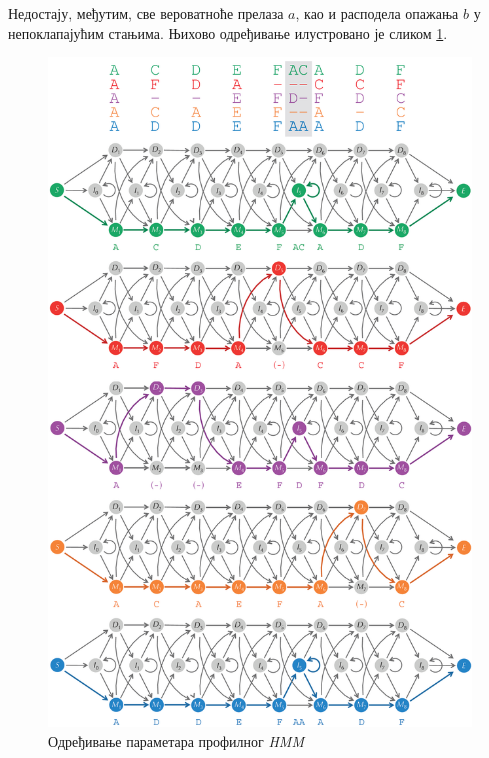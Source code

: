 \documentclass[12pt,oneside]{memoir}
\begin{document}
\begin{CJK}{UTF8}{ipxm}
Недостају, међутим, све вероватноће прелаза $a$, као и расподела опажања $b$ у непоклапајућим стањима. Њихово одређивање илустровано је сликом \ref{fig:prof_param}.

\begin{figure}[H]
  \centering
  \includegraphics[height=.97\textheight]{prof_param.png}
  \caption{Одређивање параметара профилног \textit{HMM} \cite{compeau2015}}
  \label{fig:prof_param}
\end{figure}


\end{CJK}
\end{document}

